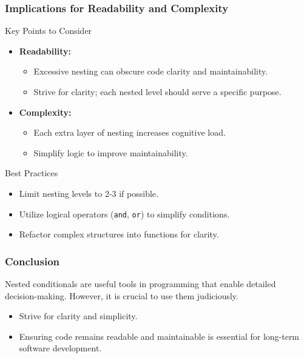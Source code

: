 \documentclass{beamer}
\begin{document}
\begin{frame}
    \frametitle{Implications for Readability and Complexity}
    \begin{block}{Key Points to Consider}
        \begin{itemize}
            \item \textbf{Readability:}
                \begin{itemize}
                    \item Excessive nesting can obscure code clarity and maintainability.
                    \item Strive for clarity; each nested level should serve a specific purpose.
                \end{itemize}
            \item \textbf{Complexity:}
                \begin{itemize}
                    \item Each extra layer of nesting increases cognitive load.
                    \item Simplify logic to improve maintainability.
                \end{itemize}
        \end{itemize}
    \end{block}
    
    \begin{block}{Best Practices}
        \begin{itemize}
            \item Limit nesting levels to 2-3 if possible.
            \item Utilize logical operators (\texttt{and}, \texttt{or}) to simplify conditions.
            \item Refactor complex structures into functions for clarity.
        \end{itemize}
    \end{block}
\end{frame}

\begin{frame}
    \frametitle{Conclusion}
    Nested conditionals are useful tools in programming that enable detailed decision-making. However, it is crucial to use them judiciously. 
    \begin{itemize}
        \item Strive for clarity and simplicity.
        \item Ensuring code remains readable and maintainable is essential for long-term software development.
    \end{itemize}
\end{frame}
\end{document}
